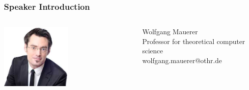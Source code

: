 \documentclass{beamer}
\begin{document}
	\begin{frame}
	\frametitle{Speaker Introduction}
	\begin{minipage}[c]{1.0\linewidth}
		\begin{columns}
		\begin{column}{0.35\textwidth}
			\begin{center}
     		\includegraphics[width=0.5\textwidth]{pics/speakers_mauerer.jpeg}
			\end{center}
		\end{column}
		\begin{column}{1.0\textwidth}
			Wolfgang Mauerer\\Professor for theoretical computer science\\ wolfgang.mauerer@othr.de
		\end{column}
		\end{columns}


\end{minipage}
\end{frame}
\end{document}
